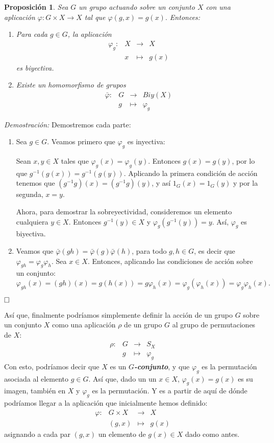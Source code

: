 \documentclass[12pt]{article}
\newtheorem{proposition}[theorem]{Proposición}
\begin{document}
\begin{proposition}
Sea $G$ un grupo actuando sobre un conjunto $X$ con una aplicación $\varphi\colon G \times X \longrightarrow X$ tal que $\varphi(g,x)=g(x).$ Entonces: 
\begin{enumerate}
\item Para cada $g \in G$, la aplicación $$\begin{array}{rccl}
\varphi_{g}\colon &X& \longrightarrow &X\\
&x& \longmapsto &g(x)
\end{array}
$$ es biyectiva.
\item Existe un homomorfismo de grupos $$\begin{array}{rccl}
\bar{\varphi}\colon &G& \longrightarrow &Biy(X)\\
&g& \longmapsto &\varphi_{g}
\end{array}
$$ 
\end{enumerate} 
\end{proposition}
\emph{Demostración: }Demostremos cada parte:
\begin{enumerate}
\item Sea $g \in G$. Veamos primero que $\varphi_{g}$ es inyectiva:

Sean $x,y \in X$ tales que $\varphi_{g}(x) = \varphi_{g}(y)$. Entonces $g(x) = g(y)$, por lo que $g^{-1}(g(x)) = g^{-1}(g(y))$. Aplicando la primera condición de acción tenemos que $(g^{-1}g)(x) = (g^{-1}g)(y)$, y así $1_{G}(x) = 1_{G}(y)$ y por la segunda, $x = y$.

Ahora, para demostrar la sobreyectividad, consideremos un elemento cualquiera $y \in X$. Entonces $g^{-1}(y) \in X$ y $\varphi_{g}(g^{-1}(y)) = y$. Así, $\varphi_{g}$ es biyectiva.
\item Veamos que $\bar{\varphi}(gh) = \bar{\varphi}(g) \bar{\varphi}(h)$, para todo $g,h \in G$, es decir que $\varphi_{gh} = \varphi_{g}\varphi_{h}$. Sea $x \in X$. Entonces, aplicando las condiciones de acción sobre un conjunto:$$\varphi_{gh}(x) =(gh)(x)= g(h(x))= g\varphi_{h}(x)= \varphi_{g}(\varphi_{h}(x)) = \varphi_{g} \varphi_{h}(x).$$ 
\end{enumerate}
$\hfill \square$

Así que, finalmente podríamos simplemente definir la acción de un grupo $G$ sobre un conjunto $X$ como una aplicación $\rho$ de un grupo $G$ al grupo de permutaciones de $X$: 
$$\begin{array}{rccl}
\rho\colon &G& \longrightarrow &S_{X}\\
&g& \longmapsto &\varphi_{g}
\end{array}
$$ 
Con esto, podríamos decir que $X$ es un \textbf{\textit{$G$-conjunto}}, y que $\varphi_{g}$ es la permutación asociada al elemento $g \in G$. Así que, dado un un $x \in X$, $\varphi_{g}(x)= g(x)$ es su imagen, también en $X$ y $\varphi_{g}$ es la permutación. Y es a partir de aquí de dónde podríamos llegar a la aplicación que inicialmente hemos definido: 
$$\begin{array}{rccl}
\varphi\colon &G \times X& \longrightarrow &X\\
&(g,x)& \longmapsto &g(x)
\end{array}
$$ 
asignando a cada par $(g,x)$ un elemento de $g(x) \in X$ dado como antes.
\end{document}
